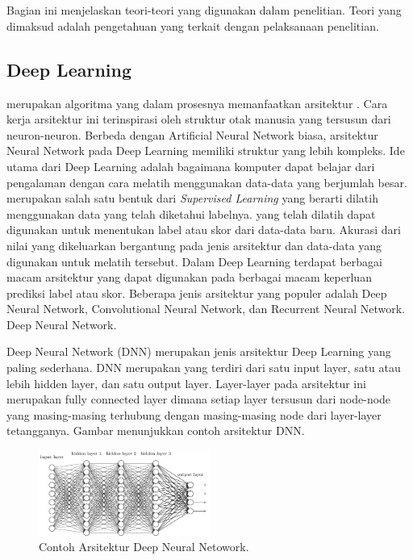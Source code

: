 \chapter{\babDua}
Bagian ini menjelaskan teori-teori yang digunakan dalam penelitian. Teori yang dimaksud adalah pengetahuan yang terkait dengan pelaksanaan penelitian.

\section{Deep Learning}
\deeplearning merupakan algoritma \ml yang dalam prosesnya memanfaatkan arsitektur \nn. Cara kerja arsitektur ini terinspirasi oleh struktur otak manusia yang tersusun dari neuron-neuron. Berbeda dengan Artificial Neural Network biasa, arsitektur Neural Network pada Deep Learning memiliki struktur yang lebih kompleks. Ide utama dari Deep Learning adalah bagaimana komputer dapat belajar dari pengalaman dengan cara melatih \nn menggunakan data-data yang berjumlah besar. \deeplearning merupakan salah satu bentuk dari \textit{Supervised Learning} yang berarti \nn dilatih menggunakan data yang telah diketahui labelnya. \nn yang telah dilatih dapat digunakan untuk menentukan label atau skor dari data-data baru. Akurasi dari nilai yang dikeluarkan bergantung pada jenis arsitektur dan data-data yang digunakan untuk melatih \nn tersebut. Dalam Deep Learning terdapat berbagai macam arsitektur yang dapat digunakan pada berbagai macam keperluan prediksi label atau skor. Beberapa jenis arsitektur yang populer adalah Deep Neural Network, Convolutional Neural Network, dan Recurrent Neural Network. Deep Neural Network.

Deep Neural Network (DNN) merupakan jenis arsitektur Deep Learning yang paling sederhana. DNN merupakan \nn yang terdiri dari satu input layer, satu atau lebih hidden layer, dan satu output layer. Layer-layer pada arsitektur ini merupakan fully connected layer dimana setiap layer tersusun dari node-node yang masing-masing terhubung dengan masing-masing node dari layer-layer tetangganya. Gambar menunjukkan contoh arsitektur DNN.

\begin{figure}
	\centering
	\includegraphics[width=0.50\textwidth]
	{pics/dnn.png}
	\caption{Contoh Arsitektur Deep Neural Netowork.}
	\label{fig:dnn}
\end{figure}


